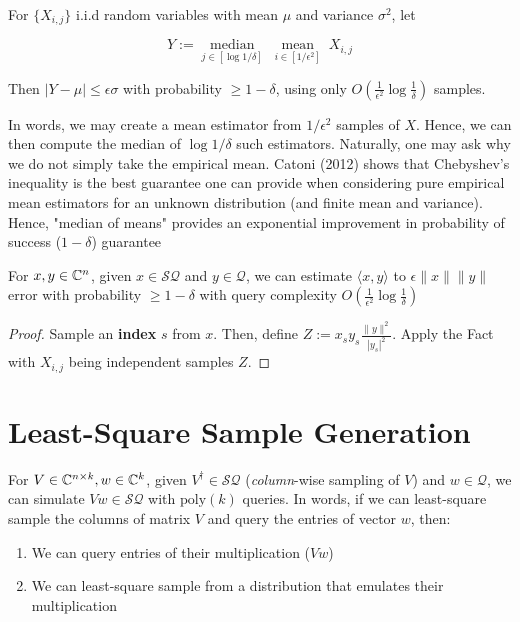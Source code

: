 \documentclass[main.tex]{subfiles}
\begin{document}
\begin{fact} For $\{X_{i,j}\}$ i.i.d random variables with mean $\mu$ and variance $\sigma^2$, let 

$$Y := \underset{j \in [\log 1/\delta]}{\operatorname{median}}\;\underset{i \in [1/\epsilon^2]}{\operatorname{mean}}\;X_{i,j}$$

Then $\vert Y - \mu\vert \leq \epsilon\sigma$ with probability $\geq 1-\delta$, using only $O(\frac{1}{\epsilon^2}\log\frac{1}{\delta})$ samples.
\end{fact}

In words, we may create a mean estimator from $1/\epsilon^2$ samples of $X$. Hence, we can then compute the median of $\log 1/\delta$ such estimators. Naturally, one may ask why we do not simply take the empirical mean. Catoni (2012) shows that Chebyshev's inequality is the best guarantee one can provide when considering pure empirical mean estimators for an unknown distribution (and finite mean and variance). Hence, "median of means" provides an exponential improvement in probability of success ($1 - \delta$) guarantee

\begin{corollary} For $x,y \in\mathbb{C}^n$, given $x \in \mathcal{SQ}$ and $y \in \mathcal{Q}$, we can estimate $\langle x,y\rangle$ to $\epsilon\|x\|\|y\|$ error with probability $\geq 1-\delta$ with query complexity $O(\frac{1}{\epsilon^2}\log\frac{1}{\delta})$
\end{corollary}
\begin{proof}Sample an \textbf{index} $s$ from $x$. Then, define $Z := x_s y_s\frac{\|y\|^2}{|y_s|^2}$. Apply the Fact with $X_{i,j}$ being independent samples $Z$.
\end{proof}	

\section{Least-Square Sample Generation}

For $V \in \mathbb{C}^{n\times k}, w \in \mathbb{C}^k$, given $V^\dagger \in \mathcal{SQ}$ (\textit{column}-wise sampling of $V$) and $w \in \mathcal{Q}$, we can simulate $Vw \in \mathcal{SQ}$ with $\text{poly}(k)$ queries. In words, if we can least-square sample the columns of matrix $V$ and query the entries of vector $w$, then: 

\begin{enumerate}
\item  We can query entries of their multiplication ($Vw$) 
\item We can least-square sample from a distribution that emulates their multiplication	
\end{enumerate}
\end{document}

